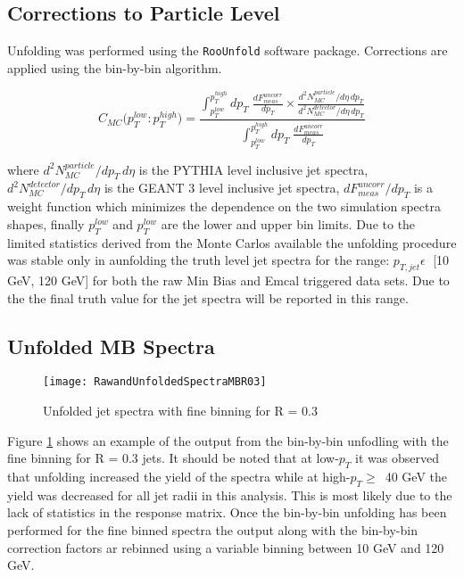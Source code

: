 \subsection{Corrections to Particle Level}

Unfolding was performed using the \verb+RooUnfold+\cite{Adye:2011gm} software package.  Corrections are applied using the bin-by-bin\cite{Cowan:2002in} algorithm. 

\begin{equation}
C_{MC} \big( p_{T}^{low} : p_{T}^{high} \big) =  \frac{  \int^{p_{T}^{high}}_{p_{T}^{low}} dp_{T} \; \frac{dF^{uncorr}_{meas}}{dp_{T}} \times \frac{d^{2}N^{particle}_{MC}/d\eta \, dp_{T}}{d^{2}N^{detector}_{MC}/d\eta \, dp_{T}}  } { \int^{p_{T}^{high}}_{p_{T}^{low}} dp_{T} \; \frac{dF^{uncorr}_{meas}}{dp_{T}} }
\label{eq:binbybin}
\end{equation}

\noindent
where $d^{2}N^{particle}_{MC}/dp_{T} \, d\eta$ is the PYTHIA level inclusive jet spectra, $d^{2}N^{detector}_{MC}/dp_{T} \, d\eta$ is the GEANT 3 level inclusive jet spectra, $dF^{uncorr}_{meas} / dp_{T}$ is a weight function which minimizes the dependence on the two simulation spectra shapes, finally $p_{T}^{low}$ and $p_{T}^{low}$ are the lower and upper bin limits.  Due to the limited statistics derived from the Monte Carlos available the unfolding procedure was stable only in aunfolding the truth level jet spectra for the range: $p_{T,jet} \epsilon \;$ [10 GeV, 120 GeV] for both the raw Min Bias and Emcal triggered data sets.  Due to the  the final truth value for the jet spectra will be reported in this range.



\subsection{Unfolded MB Spectra}

\begin{figure}[h]
\texttt{[image: RawandUnfoldedSpectraMBR03]}
\centering
\caption{Unfolded jet spectra with fine binning for R = 0.3}
\label{fig:Unfoldfine}
\end{figure}

Figure \ref{fig:Unfoldfine} shows an example of the output from the bin-by-bin unfodling with the fine binning for R = 0.3 jets.  It should be noted that at low-$p_{T}$ it was observed that unfolding increased the yield of the spectra while at high-$p_{T} \geq \,$ 40 GeV the yield was decreased for all jet radii in this analysis.  This is most likely due to the lack of statistics in the response matrix.  Once the bin-by-bin unfolding has been performed for the fine binned spectra the output along with the bin-by-bin correction factors ar rebinned using a variable binning between 10 GeV and 120 GeV.

